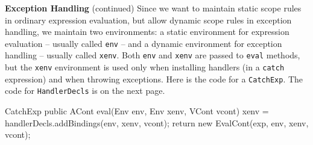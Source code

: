 \begin{minipage}[t]{\sw}
\slidenumber
\LARGE
{\bf Exception Handling} (continued)\exx
Since we want to maintain static scope rules
in ordinary expression evaluation,
but allow dynamic scope rules in exception handling,
we maintain two environments:
a static environment for expression evaluation --
usually called \verb'env' --
and a dynamic environment for exception handling --
usually called \verb'xenv'.
Both \verb'env' and \verb'xenv' are passed
to \verb'eval' methods,
but the \verb'xenv' environment is used only
when installing handlers (in a \verb'catch' expression)
and when throwing exceptions.\exx
Here is the code for a \verb'CatchExp'.
The code for \verb'HandlerDecls' is on the next page.
\Large
\begin{qv}
CatchExp
    public ACont eval(Env env, Env xenv, VCont vcont) {
        xenv = handlerDecls.addBindings(env, xenv, vcont);
        return new EvalCont(exp, env, xenv, vcont);
    }
\end{qv}
\end{minipage}
